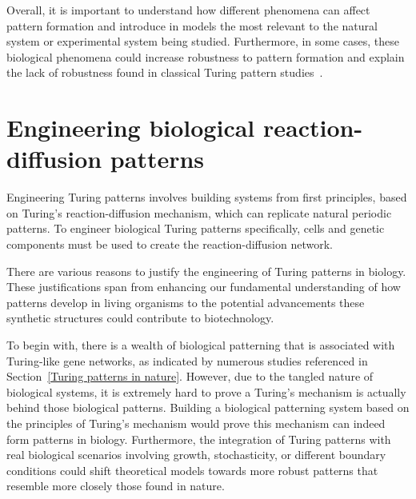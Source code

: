 Overall, it is important to understand how different phenomena can affect pattern formation and introduce in models the most relevant to the natural system or experimental system being studied.
Furthermore, in some cases, these biological phenomena could increase robustness to pattern formation and explain the lack of robustness found in classical Turing pattern studies~\parencite{Scholes2019}.
%


\section{Engineering biological reaction-diffusion patterns}
Engineering Turing patterns involves building systems from first principles, based on Turing's reaction-diffusion mechanism, which can replicate natural periodic patterns.
To engineer biological Turing patterns specifically, cells and genetic components must be used to create the reaction-diffusion network.


There are various reasons to justify the engineering of Turing patterns in biology.
These justifications span from enhancing our fundamental understanding of how patterns develop in living organisms to the potential advancements these synthetic structures could contribute to biotechnology.

To begin with, there is a wealth of biological patterning that is associated with Turing-like gene networks, as indicated by numerous studies referenced in Section~\ref{Turing patterns in nature}.
However, due to the tangled nature of biological systems, it is extremely hard to prove a Turing’s mechanism is actually behind those biological patterns.
Building a biological patterning system based on the principles of Turing's mechanism would prove this mechanism can indeed form patterns in biology.
Furthermore, the integration of Turing patterns with real biological scenarios involving growth, stochasticity, or different boundary conditions could shift theoretical models towards more robust patterns that resemble more closely those found in nature.


